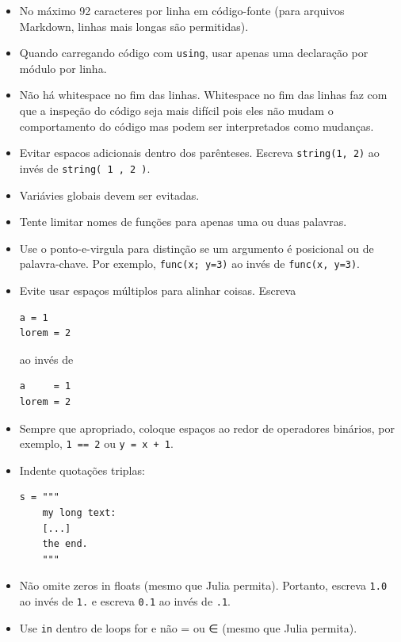 \documentclass[
  notoc %
]{tufte-book}
\newcommand{\passthrough}[1]{#1}
\begin{document}
\begin{itemize}
\item
  No máximo 92 caracteres por linha em código-fonte (para arquivos
  Markdown, linhas mais longas são permitidas).
\item
  Quando carregando código com \passthrough{\lstinline!using!}, usar
  apenas uma declaração por módulo por linha.
\item
  Não há whitespace no fim das linhas. Whitespace no fim das linhas faz
  com que a inspeção do código seja mais difícil pois eles não mudam o
  comportamento do código mas podem ser interpretados como mudanças.
\item
  Evitar espacos adicionais dentro dos parênteses. Escreva
  \passthrough{\lstinline!string(1, 2)!} ao invés de
  \passthrough{\lstinline!string( 1 , 2 )!}.
\item
  Variávies globais devem ser evitadas.
\item
  Tente limitar nomes de funções para apenas uma ou duas palavras.
\item
  Use o ponto-e-virgula para distinção se um argumento é posicional ou
  de palavra-chave. Por exemplo, \passthrough{\lstinline!func(x; y=3)!}
  ao invés de \passthrough{\lstinline!func(x, y=3)!}.
\item
  Evite usar espaços múltiplos para alinhar coisas. Escreva

\begin{lstlisting}
a = 1
lorem = 2
\end{lstlisting}

  ao invés de

\begin{lstlisting}
a     = 1
lorem = 2
\end{lstlisting}
\item
  Sempre que apropriado, coloque espaços ao redor de operadores
  binários, por exemplo, \passthrough{\lstinline!1 == 2!} ou
  \passthrough{\lstinline!y = x + 1!}.
\item
  Indente quotações triplas:

\begin{lstlisting}
s = """
    my long text:
    [...]
    the end.
    """
\end{lstlisting}
\item
  Não omite zeros in floats (mesmo que Julia permita). Portanto, escreva
  \passthrough{\lstinline!1.0!} ao invés de \passthrough{\lstinline!1.!}
  e escreva \passthrough{\lstinline!0.1!} ao invés de
  \passthrough{\lstinline!.1!}.
\item
  Use \passthrough{\lstinline!in!} dentro de loops for e não = ou ∈
  (mesmo que Julia permita).
\end{itemize}
\end{document}
